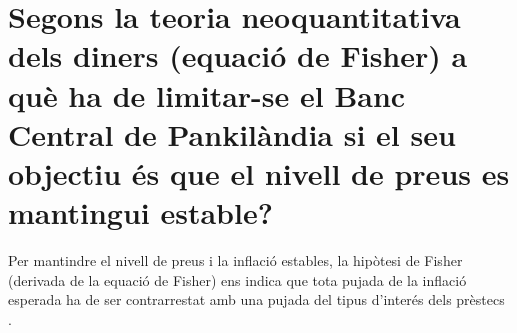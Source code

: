 \section{Segons la teoria neoquantitativa dels diners (equació de Fisher) a què ha de
limitar-se el Banc Central de Pankilàndia si el seu objectiu és que el nivell
de preus es mantingui estable?}

Per mantindre el nivell de preus i la inflació estables,
la hipòtesi de Fisher (derivada de la equació de Fisher) ens indica que
tota pujada de la inflació esperada ha de ser contrarrestat amb una pujada
del tipus d'interés dels prèstecs \cite{fisher_equation}.

